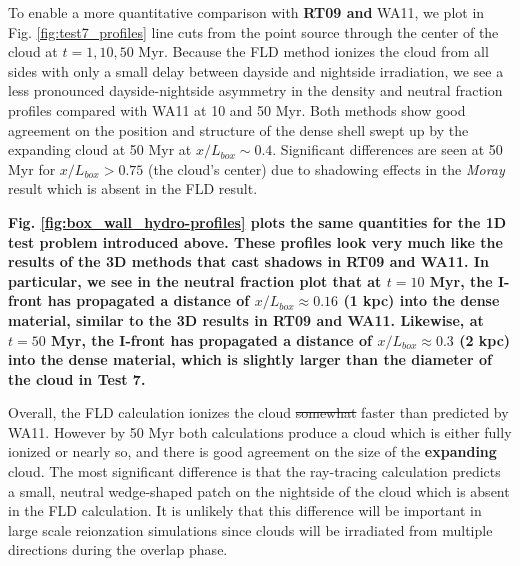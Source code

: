 To enable a more quantitative comparison with {\bf RT09 and}  WA11,
we plot in Fig. \ref{fig:test7_profiles} line cuts from the point source through the center of the cloud at
$t=1, 10, 50$ Myr. 
Because the FLD method ionizes the cloud from all sides with only a small delay between
dayside and nightside irradiation, we see a less pronounced dayside-nightside asymmetry in the density and neutral fraction 
profiles compared with WA11 at 10 and 50 Myr. Both methods show good agreement on the position and structure
of the dense shell swept up by the expanding cloud at 50 Myr at $x/L_{box} \sim 0.4$. 
Significant differences are seen at 50 Myr for $x/L_{box} > 0.75$ (the cloud's center) due to shadowing effects in the {\em Moray} result
which is absent in the FLD result.  

{\bf Fig. \ref{fig:box_wall_hydro-profiles} plots the same quantities for the 1D test problem introduced above. These profiles look very much like the results of the 3D methods that cast shadows in RT09 and WA11. In particular, we see in the neutral fraction plot that at $t=10$ Myr, the I-front has propagated a distance of $x/L_{box} \approx 0.16 $ (1 kpc) into the dense material, similar to the 3D results in RT09 and WA11. Likewise, at $t=50$ Myr, the I-front has propagated a distance of $x/L_{box} \approx 0.3 $ (2 kpc) into the dense material, which is slightly larger than the diameter of the cloud in Test 7. } 

Overall, the FLD calculation ionizes the cloud \st{somewhat} faster than predicted by WA11. However by 50 Myr both calculations
produce a cloud which is either fully ionized or nearly so, and there is good agreement on the size of the {\bf expanding} cloud.  
The most significant difference is that the ray-tracing calculation predicts a small, neutral wedge-shaped patch on the nightside
of the cloud which is absent in the FLD calculation. It is unlikely that this difference will be important in large scale reionzation
simulations since clouds will be irradiated from multiple directions during the overlap phase. 


